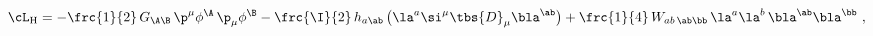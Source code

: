 \begin{equation}
  \cL_\mathrm{H} = - \frc{1}{2}\, G_{\A\B}\, \p^\mu \phi^\A\, \p_\mu
  \phi^\B - \frc{\I}{2}\, h_{a\ab}\, \big( \la^a \si^\mu \tbs{D}_\mu
  \bla^\ab \big) + \frc{1}{4}\, W_{ab\,\ab\bb}\, \la^a \la^b\, \bla^\ab
  \bla^\bb\ ,\label{L-HM}
 \end{equation}


